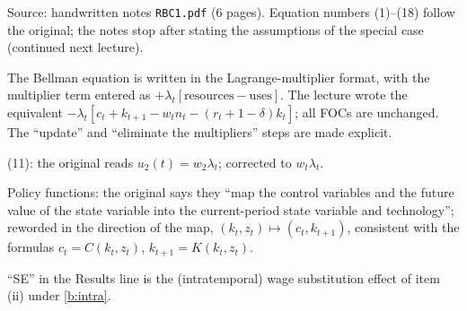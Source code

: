 \documentclass[11pt]{article}
\begin{document}
\begin{transcriptnotes}
  \item Source: handwritten notes \texttt{RBC1.pdf} (6 pages). Equation numbers
        (1)--(18) follow the original; the notes stop after stating the assumptions of
        the special case (continued next lecture).
  \item The Bellman equation is written in the Lagrange-multiplier format, with the
        multiplier term entered as $+\lambda_t[\text{resources}-\text{uses}]$. The lecture
        wrote the equivalent $-\lambda_t[c_t+k_{t+1}-w_tn_t-(r_t+1-\delta)k_t]$; all FOCs
        are unchanged. The ``update'' and ``eliminate the multipliers'' steps are made
        explicit.
  \item (11): the original reads $u_2(t)=w_{\scriptscriptstyle 2}\lambda_t$; corrected
        to $w_t\lambda_t$.
  \item Policy functions: the original says they ``map the control variables and the
        future value of the state variable into the current-period state variable and
        technology''; reworded in the direction of the map, $(k_t,z_t)\mapsto(c_t,k_{t+1})$,
        consistent with the formulas $c_t=C(k_t,z_t)$, $k_{t+1}=K(k_t,z_t)$.
  \item ``SE'' in the Results line is the (intratemporal) wage substitution effect of
        item (ii) under \eqref{b:intra}.
\end{transcriptnotes}
\end{document}

